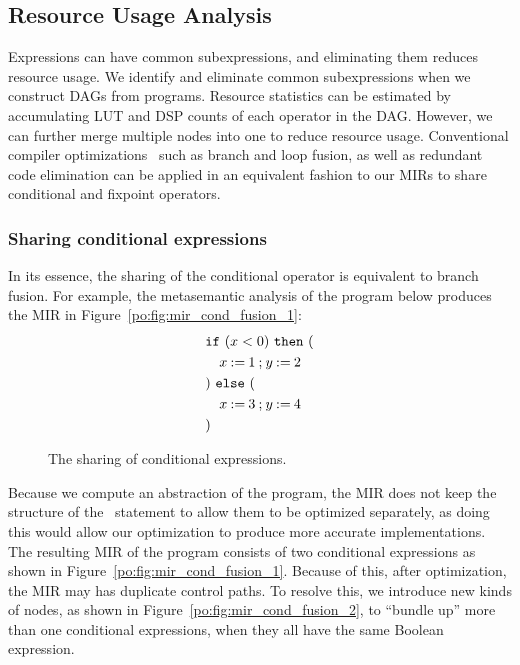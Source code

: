 \subsection{Resource Usage Analysis}
\label{po:sub:resource_usage_analysis}

Expressions can have common subexpressions, and eliminating them reduces
resource usage.  We identify and eliminate common subexpressions when we
construct DAGs from programs.  Resource statistics can be estimated by
accumulating LUT and DSP counts of each operator in the DAG\@.  However, we can
further merge multiple nodes into one to reduce resource usage.  Conventional
compiler optimizations~\cite{kuck81} such as branch and loop fusion, as well as
redundant code elimination can be applied in an equivalent fashion to our MIRs
to share conditional and fixpoint operators.

\subsubsection{Sharing conditional expressions}

In its essence, the sharing of the conditional operator is equivalent to branch
fusion.  For example, the metasemantic analysis of the program below produces
the MIR in Figure~\ref{po:fig:mir_cond_fusion_1}:
\begin{equation}
    \begin{aligned}
        & \texttt{if}~(x < 0)~\texttt{then}~( \\
        & \quad x\mathbin{:=}{1} \mathbin{;}
                y\mathbin{:=}{2} \\
        & )~\texttt{else}~( \\
        & \quad x\mathbin{:=}{3} \mathbin{;}
                y\mathbin{:=}{4} \\
        & )
    \end{aligned}
\end{equation}

\begin{figure}[ht]
    \centering
    \quad
    \caption{The sharing of conditional expressions.}
\end{figure}

Because we compute an abstraction of the program, the MIR does not keep
the structure of the \iflit~statement to allow them to be optimized
separately, as doing this would allow our optimization to produce more
accurate implementations.  The resulting MIR of the program consists of two
conditional expressions as shown in Figure~\ref{po:fig:mir_cond_fusion_1}.
Because of this, after optimization, the MIR may has duplicate control
paths.  To resolve this, we introduce new kinds of nodes, as shown in
Figure~\ref{po:fig:mir_cond_fusion_2}, to ``bundle up'' more than one
conditional expressions, when they all have the same Boolean expression.


